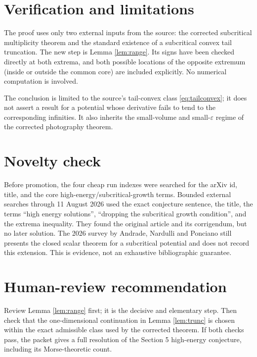 \documentclass[11pt]{article}
\begin{document}
\section{Verification and limitations}

The proof uses only two external inputs from the source: the corrected
subcritical multiplicity theorem and the standard existence of a subcritical
convex tail truncation.  The new step is Lemma \ref{lem:range}.  Its signs have
been checked directly at both extrema, and both possible locations of the
opposite extremum (inside or outside the common core) are included explicitly.
No numerical computation is involved.

The conclusion is limited to the source's tail-convex class
\eqref{eq:tailconvex}; it does not assert a result for a potential whose
derivative fails to tend to the corresponding infinities.  It also inherits
the small-volume and small-$\varepsilon$ regime of the corrected photography
theorem.

\section{Novelty check}

Before promotion, the four cheap run indexes were searched for the arXiv id,
title, and the core high-energy/subcritical-growth terms.  Bounded external
searches through 11 August 2026 used the exact conjecture sentence, the title,
the terms ``high energy solutions'', ``dropping the subcritical growth
condition'', and the extrema inequality.  They found the original article and
its corrigendum, but no later solution.  The 2026 survey by Andrade, Nardulli
and Ponciano \cite{survey} still presents the closed scalar theorem for a
subcritical potential and does not record this extension.  This is evidence,
not an exhaustive bibliographic guarantee.

\section{Human-review recommendation}

Review Lemma \ref{lem:range} first; it is the decisive and elementary step.
Then check that the one-dimensional continuation in Lemma \ref{lem:trunc} is
chosen within the exact admissible class used by the corrected theorem.  If
both checks pass, the packet gives a full resolution of the Section 5
high-energy conjecture, including its Morse-theoretic count.
\end{document}
